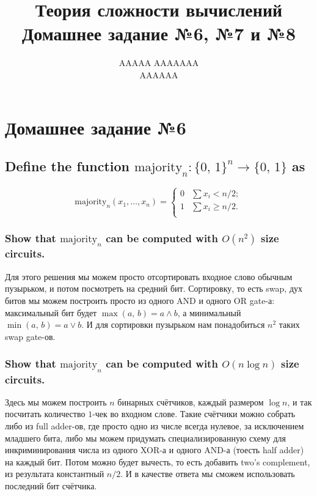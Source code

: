 \documentclass{article}
\title{Теория сложности вычислений \\ Домашнее задание №6, №7 и №8}
\author{AAAAA AAAAAAA \\ AAAAAA}
\begin{document}
  \maketitle

  \setcounter{section}{5}
  \section{Домашнее задание №6}
  \setcounter{subsection}{8}
  \subsection{Define the function $\mathrm{majority}_n: \{0,\, 1\}^n \to \{0,\, 1\}$ as}
  $$\mathrm{majority}_n(x_1,\dots,x_n) = \begin{cases}
    0 & \sum x_i < n/2;\\
    1 & \sum x_i \geq n/2.\\
  \end{cases}$$
  \subsubsection{Show that $\mathrm{majority}_n$ can be computed with $O(n^2)$ size circuits.}
  Для этого решения мы можем просто отсортировать входное слово обычным пузырьком, и потом посмотреть на средний бит.
  Сортировку, то есть swap, дух битов мы можем построить просто из одного AND и одного OR gate-а:
  максимальный бит будет $\max(a,\, b) = a \land b$, а минимальный $\min(a,\, b) = a \lor b$.
  И для сортировки пузырьком нам понадобиться $n^2$ таких swap gate-ов.

  \subsubsection{Show that $\mathrm{majority}_n$ can be computed with $O(n\log n)$ size circuits.}
  Здесь мы можем построить $n$ бинарных счётчиков, каждый размером $\log n$, и так посчитать количество $1$-чек во входном слове.
  Такие счётчики можно собрать либо из full adder-ов, где просто одно из числе всегда нулевое, за исключением младшего бита, либо мы можем придумать специализированную схему для инкриминирования числа из одного XOR-а и одного AND-а (тоесть half adder) на каждый бит.
  Потом можно будет вычесть, то есть добавить two's complement, из результата константный $n/2$.
  И в качестве ответа мы сможем использовать последний бит счётчика.
\end{document}
